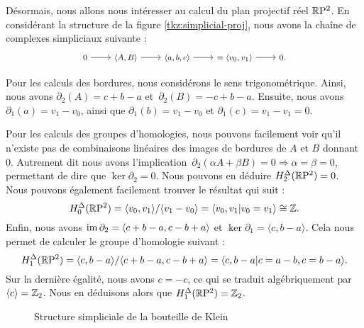 \begin{exemple}
Désormais, nous allons nous intéresser au calcul du plan projectif réel $\mathbb{R}\mathrm{P}^2$. En considérant la structure de la figure \ref{tkz:simplicial-proj}, nous avons la chaîne de complexes simpliciaux suivante : 
\[\footnotesize
\begin{tikzcd}
0\arrow[r]&\langle A,B\rangle\arrow[r]&\langle a,b,c\rangle\arrow[r]&=\langle v_0,v_1\rangle\arrow[r]&0.
\end{tikzcd}
\]

Pour les calculs des bordures, nous considérons le sens trigonométrique. Ainsi, nous avons $\partial_2(A)=c+b-a$ et~$\partial_2(B)=-c+b-a$. Ensuite, nous avons $\partial_1(a)=v_1-v_0$, ainsi que $\partial_1(b)=v_1-v_0$ et $\partial_1(c)=v_1-v_1=0$.

\bigskip Pour les calculs des groupes d'homologies, nous pouvons facilement voir qu'il n'existe pas de combinaisons linéaires des images de bordures de $A$ et $B$ donnant 0. Autrement dit nous avons l'implication~$\partial_2(\alpha A+\beta B)=0\Rightarrow \alpha=\beta=0$, permettant de dire que $\ker\partial_2=0$. Nous pouvons en déduire $H^\Delta_2(\mathbb{R}\mathrm{P}^2)=0$. Nous pouvons également facilement trouver le résultat qui suit : $$H^\Delta_0(\mathbb{R}\mathrm{P}^2)=\langle v_0,v_1\rangle/\langle v_1-v_0\rangle=\langle v_0,v_1|v_0=v_1\rangle\cong\mathbb{Z}.$$Enfin, nous avons $\mathrm{im}\,\partial_2=\langle c+b-a,c-b+a\rangle$ et $\ker\partial_1=\langle c, b-a\rangle$. Cela nous permet de calculer le groupe d'homologie suivant : \[H^\Delta_1(\mathbb{R}\mathrm{P}^2)=\langle c, b-a\rangle/\langle c+b-a,c-b+a\rangle=\langle c,b-a|c=a-b,c=b-a\rangle.\]Sur la dernière égalité, nous avons $c=-c$, ce qui se traduit algébriquement par $\langle c\rangle=\mathbb{Z}_2$. Nous en déduisons alors que $H^\Delta_1(\mathbb{R}\mathrm{P}^2)=\mathbb{Z}_2$.
\end{exemple}

\begin{wrapfigure}{r}{.3\textwidth}
\centering
{}
\caption{\centering Structure simpliciale de la bouteille de Klein}
\label{tkz:klein-bottle-simp}
\end{wrapfigure}

